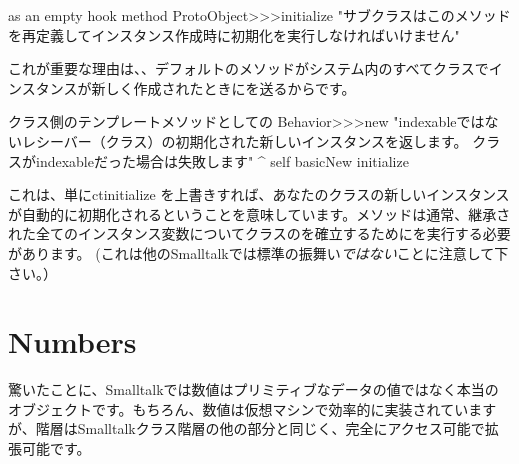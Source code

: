 \documentclass[a4paper,10pt,twoside]{book}
\begin{document}
\begin{method}{ as an empty hook method}
ProtoObject>>>initialize
   "サブクラスはこのメソッドを再定義してインスタンス作成時に初期化を実行しなければいけません"
\end{method}

これが重要な理由は、、デフォルトのメソッドがシステム内のすべてクラスでインスタンスが新しく作成されたときにを送るからです。

\begin{method}{クラス側のテンプレートメソッドとしての}
Behavior>>>new
    "indexableではないレシーバー（クラス）の初期化された新しいインスタンスを返します。
    クラスがindexableだった場合は失敗します"
    ^ self basicNew initialize
\end{method}

これは、単にct{initialize} を上書きすれば、あなたのクラスの新しいインスタンスが自動的に初期化されるということを意味しています。メソッドは通常、継承された全てのインスタンス変数についてクラスのを確立するためにを実行する必要があります。
(これは他のSmalltalkでは標準の振舞い\emph{ではない}ことに注意して下さい。）

\section{Numbers}
驚いたことに、Smalltalkでは数値はプリミティブなデータの値ではなく本当のオブジェクトです。もちろん、数値は仮想マシンで効率的に実装されていますが、階層はSmalltalkクラス階層の他の部分と同じく、完全にアクセス可能で拡張可能です。
\end{document}
